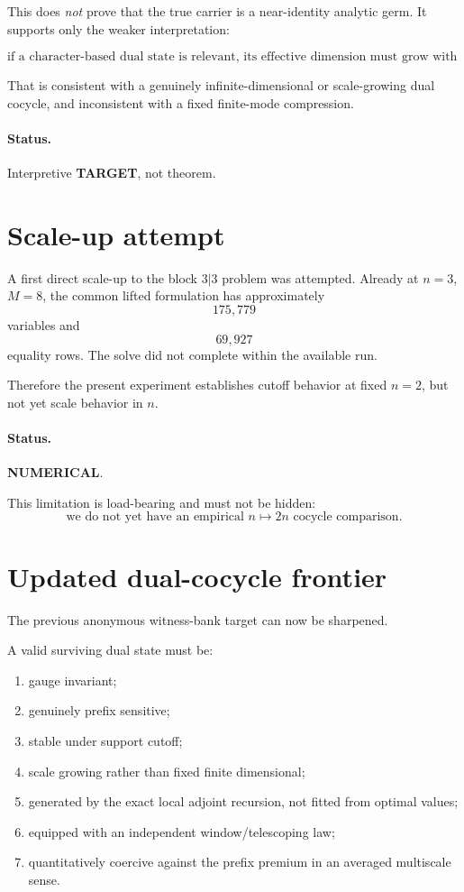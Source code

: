\documentclass[11pt,a4paper]{article}
\newcommand{\NUM}{\textcolor{blue!70!black}{\textbf{NUMERICAL}}}
\newcommand{\TARGET}{\textcolor{orange!80!black}{\textbf{TARGET}}}
\begin{document}
This does \emph{not} prove that the true carrier is a near-identity analytic
germ.
It supports only the weaker interpretation:

\[
\boxed{
\text{if a character-based dual state is relevant, its effective dimension
must grow with scale/cutoff.}
}
\tag{35}
\]

That is consistent with a genuinely infinite-dimensional or scale-growing
dual cocycle, and inconsistent with a fixed finite-mode compression.

\paragraph{Status.}
Interpretive \TARGET, not theorem.

\section{Scale-up attempt}

A first direct scale-up to the block \(3|3\) problem was attempted.
Already at \(n=3\), \(M=8\), the common lifted formulation has approximately
\[
175{,}779
\]
variables and
\[
69{,}927
\]
equality rows.
The solve did not complete within the available run.

Therefore the present experiment establishes cutoff behavior at fixed
\(n=2\), but not yet scale behavior in \(n\).

\paragraph{Status.}
\NUM.

This limitation is load-bearing and must not be hidden:
\[
\boxed{
\text{we do not yet have an empirical }n\mapsto2n\text{ cocycle comparison.}
}
\tag{36}
\]

\section{Updated dual-cocycle frontier}

The previous anonymous witness-bank target can now be sharpened.

A valid surviving dual state must be:
\begin{enumerate}
\item gauge invariant;
\item genuinely prefix sensitive;
\item stable under support cutoff;
\item scale growing rather than fixed finite dimensional;
\item generated by the exact local adjoint recursion, not fitted from optimal
values;
\item equipped with an independent window/telescoping law;
\item quantitatively coercive against the prefix premium in an averaged
multiscale sense.
\end{enumerate}
\end{document}
